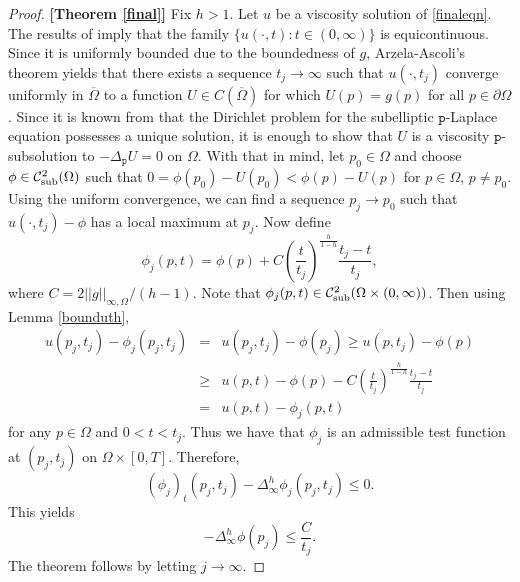 \documentclass[12pt]{amsart}
\theoremstyle{definition}
\theoremstyle{remark}
\numberwithin{equation}{section}
\begin{document}
\begin{proof} \textbf{[Theorem \ref{final}]} Fix $h>1$. Let $u$ be a viscosity solution of \eqref{finaleqn}.  The results of \cite[Chapter III]{DiB} imply that the family $\{u(\cdot,t): t \in (0,\infty)\}$ is equicontinuous.  Since it is uniformly bounded due to the boundedness of $g$, Arzela-Ascoli's theorem yields that there exists a sequence $t_j \to \infty$ such that $u(\cdot,t_j)$ converge uniformly in $\overline{\Omega}$ to a function $U \in C(\overline{\Omega})$ for which $U(p) = g(p)$ for all $p \in \partial \Omega$.  Since it is known from \cite[Lemma 5.5]{B:MP} that the Dirichlet problem for the subelliptic ${\texttt{p}}$-Laplace equation possesses a unique solution, it is enough to show that $U$ is a viscosity ${\texttt{p}}$-subsolution to  $-\Delta_{\texttt{p}} U = 0$ on $\Omega$.  With that in mind, let $p_0 \in \Omega$ and choose $\phi \in {\operatorname{\mathcal{C}^2_{\textmd{sub}}}}(\Omega)$ such that  $0 = \phi(p_0) - U(p_0) < \phi(p) - U(p)$ for $p \in \Omega$, $p \neq p_0$.  Using the uniform convergence, we can find a sequence $p_j \to p_0$ such that $u(\cdot,t_j) - \phi$ has a local maximum at $p_j$.  Now define
$$\phi_j(p,t) = \phi(p) + C\left(\frac{t}{t_j}\right)^{\frac{h}{1-h}}\frac{t_j-t}{t_j},$$
where $C = 2||g||_{\infty,\Omega}/(h-1)$.  Note that $\phi_j(p,t) \in {\operatorname{\mathcal{C}^2_{\textmd{sub}}}}(\Omega \times (0, \infty))$.  Then using Lemma \ref{bounduth},
\begin{eqnarray*}
u(p_j,t_j) - \phi_j(p_j,t_j) &=& u(p_j,t_j) - \phi(p_j) \geq u(p,t_j) - \phi(p)\\
&\geq& u(p,t) - \phi(p) - C\left(\frac{t}{t_j}\right)^{\frac{h}{1-h}}\frac{t_j-t}{t_j}\\
&=& u(p,t) - \phi_j(p,t)
\end{eqnarray*}
for any $p \in \Omega$ and $0<t < t_j$.  Thus we have that $\phi_j$ is an admissible test function at $(p_j,t_j)$ on $\Omega \times [0,T]$.  Therefore, 
$$(\phi_j)_t(p_j,t_j)-\Delta^h_{\infty}\phi_j(p_j,t_j) \leq 0.$$
This yields 
$$- \Delta^h_{\infty}\phi(p_j) \leq \frac{C}{t_j}.$$
The theorem follows by letting $j \to \infty$.
\end{proof}
\end{document}
